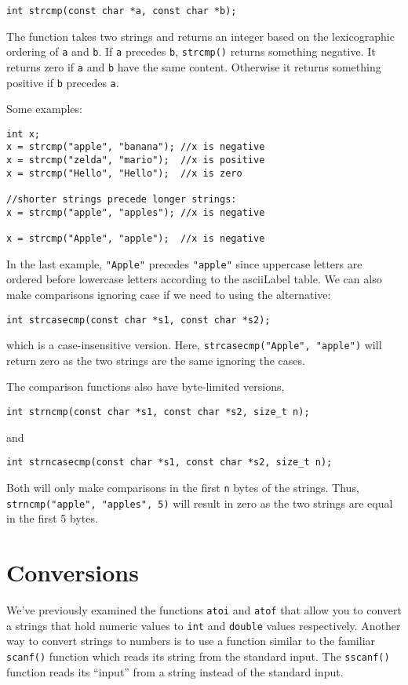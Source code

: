 \texttt{int strcmp(const char *a, const char *b);}

The function takes two strings and returns an integer based
on the lexicographic ordering of \texttt{a} and
\texttt{b}.  If \texttt{a} precedes \texttt{b}, 
\texttt{strcmp()} returns something negative.  It
returns zero if \texttt{a} and \texttt{b} 
have the same content.  Otherwise it returns something
positive if \texttt{b} precedes \texttt{a}.

Some examples:

\begin{verbatim}
int x;
x = strcmp("apple", "banana"); //x is negative
x = strcmp("zelda", "mario");  //x is positive
x = strcmp("Hello", "Hello");  //x is zero

//shorter strings precede longer strings:
x = strcmp("apple", "apples"); //x is negative

x = strcmp("Apple", "apple");  //x is negative
\end{verbatim}

In the last example, \texttt{"Apple"} precedes
\texttt{"apple"} since uppercase letters are
ordered before lowercase letters according to the
\gls{asciiLabel} table.  We can also make comparisons
ignoring case if we need to using the alternative:

\texttt{int strcasecmp(const char *s1, const char *s2);}

which is a case-insensitive version.  Here, 
\texttt{strcasecmp("Apple", "apple")} will return 
zero as the two strings are the same ignoring the cases.

The comparison functions also have byte-limited versions, 

\texttt{int strncmp(const char *s1, const char *s2, size_t n);}

and

\texttt{int strncasecmp(const char *s1, const char *s2, size_t n);}

Both will only make comparisons in the first \texttt{n}
bytes of the strings.  Thus, \texttt{strncmp("apple", "apples", 5)}
will result in zero as the two strings are equal in the first
5 bytes.

\section{Conversions}

We've previously examined the functions \texttt{atoi} 
and \texttt{atof} that allow you to convert a strings
that hold numeric values to \texttt{int} and 
\texttt{double} values respectively.  Another way to
convert strings to numbers is to use a function similar to
the familiar \texttt{scanf()} function which reads
its string from the standard input.  The \texttt{sscanf()}
function reads its ``input'' from a string instead of the
standard input.

